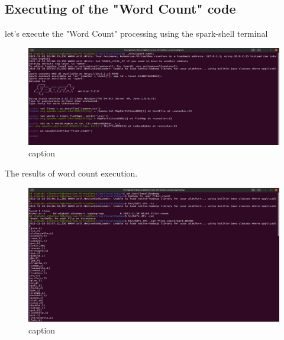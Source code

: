\begin{spacing}{1.2}
\section{Executing of the "Word Count" code}

\par let's execute the "Word Count" processing using the spark-shell terminal
\\
\begin{figure}[!htb] 
\begin{center} 
\includegraphics[width=1\linewidth]{Big_Data/Spark/Executing WCount using scala/Executing WCout.jpg} 
\end{center} 
\caption{caption} 
\end{figure} 
\FloatBarrier



\par The results of word count execution.
\\
\begin{figure}[!htb] 
\begin{center} 
\includegraphics[width=1\linewidth]{Big_Data/Spark/Executing WCount using scala/WCount Results.jpg} 
\end{center} 
\caption{caption} 
\end{figure} 
\FloatBarrier




\end{spacing}
